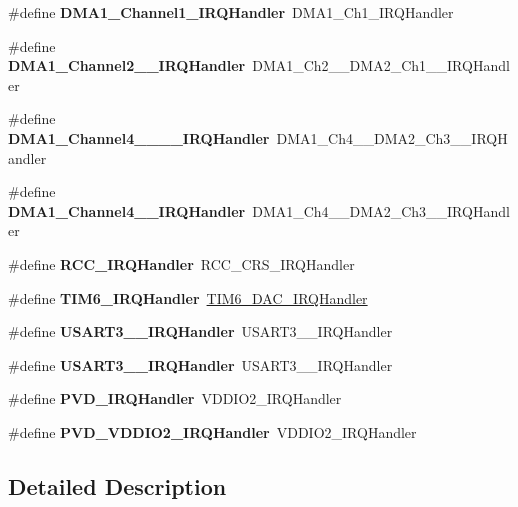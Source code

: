 \begin{DoxyCompactItemize}
\#define {\bfseries D\+M\+A1\+\_\+\+Channel1\+\_\+\+I\+R\+Q\+Handler}~D\+M\+A1\+\_\+\+Ch1\+\_\+\+I\+R\+Q\+Handler
\item 
\mbox{\label{group__stm32f098xx_ga0f84b0e43f521b06fbe4d4330047d552}} 
\#define {\bfseries D\+M\+A1\+\_\+\+Channel2\+\_\+\_\+\+I\+R\+Q\+Handler}~D\+M\+A1\+\_\+\+Ch2\+\_\+\_\+\+D\+M\+A2\+\_\+\+Ch1\+\_\+\_\+\+I\+R\+Q\+Handler
\item 
\mbox{\label{group__stm32f098xx_gae3db46ad17e9f800e0f88b489eed522d}} 
\#define {\bfseries D\+M\+A1\+\_\+\+Channel4\+\_\+\_\+\_\+\_\+\+I\+R\+Q\+Handler}~D\+M\+A1\+\_\+\+Ch4\+\_\+\_\+\+D\+M\+A2\+\_\+\+Ch3\+\_\+\_\+\+I\+R\+Q\+Handler
\item 
\mbox{\label{group__stm32f098xx_gac0e40c40e17f156c06448e594bf54eaf}} 
\#define {\bfseries D\+M\+A1\+\_\+\+Channel4\+\_\+\_\+\+I\+R\+Q\+Handler}~D\+M\+A1\+\_\+\+Ch4\+\_\+\_\+\+D\+M\+A2\+\_\+\+Ch3\+\_\+\_\+\+I\+R\+Q\+Handler
\item 
\mbox{\label{group__stm32f098xx_ga5a6d083fa78461da86a717b28973e009}} 
\#define {\bfseries R\+C\+C\+\_\+\+I\+R\+Q\+Handler}~R\+C\+C\+\_\+\+C\+R\+S\+\_\+\+I\+R\+Q\+Handler
\item 
\mbox{\label{group__stm32f098xx_gae30e35a563a952a284f3f54d7f164ccd}} 
\#define {\bfseries T\+I\+M6\+\_\+\+I\+R\+Q\+Handler}~\hyperlink{group___h_a_l___time_base___t_i_m_ga0839a45f331c4c067939b9c4533bbf4d}{T\+I\+M6\+\_\+\+D\+A\+C\+\_\+\+I\+R\+Q\+Handler}
\item 
\mbox{\label{group__stm32f098xx_gae05084e274a2e228d5ccf9423e5bce6e}} 
\#define {\bfseries U\+S\+A\+R\+T3\+\_\+\_\+\+I\+R\+Q\+Handler}~U\+S\+A\+R\+T3\+\_\+\_\+\+I\+R\+Q\+Handler
\item 
\mbox{\label{group__stm32f098xx_gaf04189172ff710986cd652a06e6f3f69}} 
\#define {\bfseries U\+S\+A\+R\+T3\+\_\+\_\+\+I\+R\+Q\+Handler}~U\+S\+A\+R\+T3\+\_\+\_\+\+I\+R\+Q\+Handler
\item 
\mbox{\label{group__stm32f098xx_ga045476dfaec8c84f5e16b06b937c0c18}} 
\#define {\bfseries P\+V\+D\+\_\+\+I\+R\+Q\+Handler}~V\+D\+D\+I\+O2\+\_\+\+I\+R\+Q\+Handler
\item 
\mbox{\label{group__stm32f098xx_ga9a2577324b65f147fff0fc4f38dcf5e2}} 
\#define {\bfseries P\+V\+D\+\_\+\+V\+D\+D\+I\+O2\+\_\+\+I\+R\+Q\+Handler}~V\+D\+D\+I\+O2\+\_\+\+I\+R\+Q\+Handler
\end{DoxyCompactItemize}


\subsection{Detailed Description}

